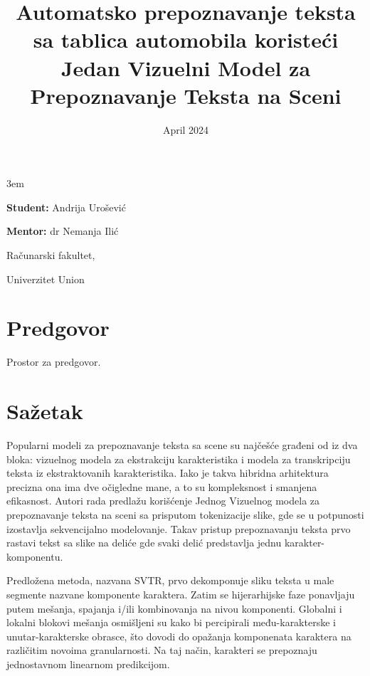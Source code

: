 \documentclass[a4paper,12pt]{article}
\title{Automatsko prepoznavanje teksta sa tablica automobila koristeći Jedan Vizuelni Model za Prepoznavanje Teksta na Sceni}
\date{}
\begin{document}
	\emergencystretch 3em
	\begin{titlepage}
		\centering
		{\huge\bfseries \maketitle}
		
		{\large
			\textbf{Student:}
			Andrija Urošević
			\par
			\bigskip
			\textbf{Mentor:}
			dr Nemanja Ilić
		}
	
		\vfill
		{\large Računarski fakultet,\par}
		{\large Univerzitet Union\par}
		\bigskip
		\date{April 2024}
	\end{titlepage}
	
	
	\section*{Predgovor}
	Prostor za predgovor.
	\newpage
	
	\tableofcontents
	\newpage
	
	
	\section*{Sažetak}
	Popularni modeli za prepoznavanje teksta sa scene su najčešće građeni od iz dva bloka: vizuelnog modela za ekstrakciju karakteristika i modela za transkripciju teksta iz ekstraktovanih karakteristika. Iako je takva hibridna arhitektura precizna ona ima dve očigledne mane, a to su kompleksnost i smanjena efikasnost. Autori rada predlažu korišćenje Jednog Vizuelnog modela za prepoznavanje teksta na sceni sa prisputom tokenizacije slike, gde se u potpunosti izostavlja sekvencijalno modelovanje. Takav pristup prepoznavanju teksta prvo rastavi tekst sa slike na deliće gde svaki delić predstavlja jednu karakter-komponentu.
	
	Predložena metoda, nazvana SVTR, prvo dekomponuje sliku teksta u male segmente nazvane komponente karaktera. Zatim se hijerarhijske faze ponavljaju putem mešanja, spajanja i/ili kombinovanja na nivou komponenti. Globalni i lokalni blokovi mešanja osmišljeni su kako bi percipirali među-karakterske i unutar-karakterske obrasce, što dovodi do opažanja komponenata karaktera na različitim novoima granularnosti. Na taj način, karakteri se prepoznaju jednostavnom linearnom predikcijom.
	
\end{document}
